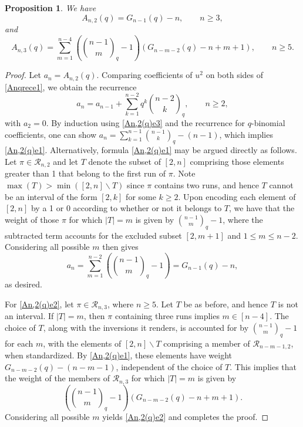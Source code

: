 \documentclass[11pt,a4paper]{article}
\newtheorem{proposition}{Proposition}[section]
\begin{document}
\begin{proposition}\label{An,2(q)}
We have
\begin{equation}\label{An,2(q)e1}
A_{n,2}(q)=G_{n-1}(q)-n, \qquad n \geq3,
\end{equation}
and
\begin{equation}\label{An,2(q)e2}
A_{n,3}(q)=\sum_{m=1}^{n-4}\left(\binom{n-1}{m}_q-1\right)(G_{n-m-2}(q)-n+m+1),  \qquad n \geq 5.
\end{equation}
\end{proposition}
\begin{proof}
Let $a_n=A_{n,2}(q)$.  Comparing coefficients of $u^2$ on both sides of \eqref{Anqrece1}, we obtain the recurrence
\begin{equation}\label{An,2(q)e3}
a_n=a_{n-1}+\sum_{k=1}^{n-2}q^k\binom{n-2}{k}_q, \qquad n \geq 2,
\end{equation}
with $a_2=0$.  By induction using \eqref{An,2(q)e3} and the recurrence for $q$-binomial coefficients, one can show $a_n=\sum_{k=1}^{n-1}\binom{n-1}{k}_q-(n-1)$, which implies \eqref{An,2(q)e1}.  Alternatively, formula \eqref{An,2(q)e1} may be argued directly as follows.  Let $\pi \in \mathcal{R}_{n,2}$ and let $T$ denote the subset of $[2,n]$ comprising those elements greater than 1 that belong to the first run of $\pi$.  Note $\max(T)>\min([2,n]\backslash T)$ since $\pi$ contains two runs, and hence $T$ cannot be an interval of the form $[2,k]$ for some $k \geq 2$.  Upon encoding each element of $[2,n]$ by a 1 or 0 according to whether or not it belongs to $T$, we have that the weight of those $\pi$ for which $|T|=m$ is given by $\binom{n-1}{m}_q-1$, where the subtracted term accounts for the excluded subset $[2,m+1]$ and $1 \leq m \leq n-2$. Considering all possible $m$ then gives
$$a_n=\sum_{m=1}^{n-2}\left(\binom{n-1}{m}_q-1\right)=G_{n-1}(q)-n,$$
as desired.

For \eqref{An,2(q)e2}, let $\pi \in \mathcal{R}_{n,3}$, where $n \geq 5$.  Let $T$ be as before, and hence $T$ is not an interval.  If $|T|=m$, then $\pi$ containing three runs implies $m \in [n-4]$.  The choice of $T$, along with the inversions it renders, is accounted for by $\binom{n-1}{m}_q-1$ for each $m$, with the elements of $[2,n]\backslash T$ comprising a member of $\mathcal{R}_{n-m-1,2}$, when standardized.  By \eqref{An,2(q)e1}, these elements have weight $G_{n-m-2}(q)-(n-m-1)$, independent of the choice of $T$.  This implies that the weight of the members of $\mathcal{R}_{n,3}$ for which $|T|=m$ is given by
$$\left(\binom{n-1}{m}_q-1\right)(G_{n-m-2}(q)-n+m+1).$$
Considering all possible $m$ yields \eqref{An,2(q)e2} and completes the proof.
\end{proof}
\end{document}
